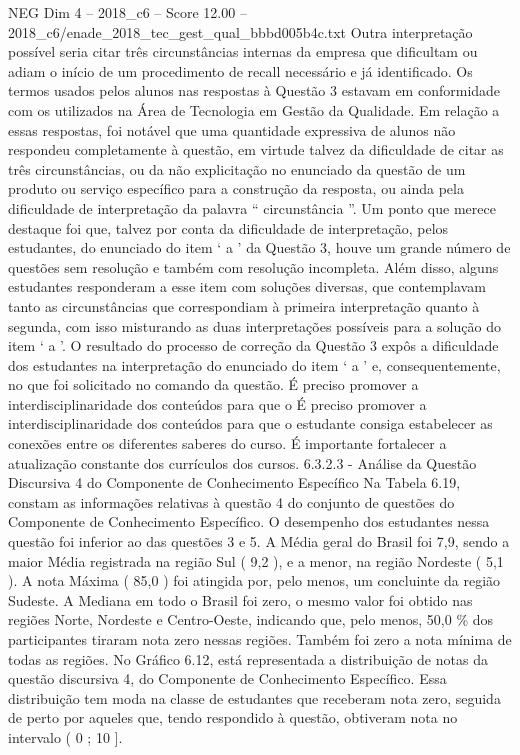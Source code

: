 \begin{textsample}{NEG Dim 4 – 2018\_c6 – Score 12.00 – 2018\_c6/enade\_2018\_tec\_gest\_qual\_bbbd005b4c.txt}
Outra interpretação possível seria citar três circunstâncias internas da empresa que dificultam ou adiam o início de um procedimento de recall necessário e já identificado.
Os termos usados pelos alunos nas respostas à Questão 3 estavam em conformidade com os utilizados na Área de Tecnologia em Gestão da Qualidade.
Em relação a essas respostas, foi notável que uma quantidade expressiva de alunos não respondeu completamente à questão, em virtude talvez da dificuldade de citar as três circunstâncias, ou da não explicitação no enunciado da questão de um produto ou serviço específico para a construção da resposta, ou ainda pela dificuldade de interpretação da palavra “ circunstância ”.
Um ponto que merece destaque foi que, talvez por conta da dificuldade de interpretação, pelos estudantes, do enunciado do item ‘ a ’ da Questão 3, houve um grande número de questões sem resolução e também com resolução incompleta.
Além disso, alguns estudantes responderam a esse item com soluções diversas, que contemplavam tanto as circunstâncias que correspondiam à primeira interpretação quanto à segunda, com isso misturando as duas interpretações possíveis para a solução do item ‘ a ’.
O resultado do processo de correção da Questão 3 expôs a dificuldade dos estudantes na interpretação do enunciado do item ‘ a ’ e, consequentemente, no que foi solicitado no comando da questão.
É preciso promover a interdisciplinaridade dos conteúdos para que o É preciso promover a interdisciplinaridade dos conteúdos para que o estudante consiga estabelecer as conexões entre os diferentes saberes do curso.
É importante fortalecer a atualização constante dos currículos dos cursos. 6.3.2.3 - Análise da Questão Discursiva 4 do Componente de Conhecimento Específico Na Tabela 6.19, constam as informações relativas à questão 4 do conjunto de questões do Componente de Conhecimento Específico.
O desempenho dos estudantes nessa questão foi inferior ao das questões 3 e 5.
A Média geral do Brasil foi 7,9, sendo a maior Média registrada na região Sul ( 9,2 ), e a menor, na região Nordeste ( 5,1 ).
A nota Máxima ( 85,0 ) foi atingida por, pelo menos, um concluinte da região Sudeste.
A Mediana em todo o Brasil foi zero, o mesmo valor foi obtido nas regiões Norte, Nordeste e Centro-Oeste, indicando que, pelo menos, 50,0 \% dos participantes tiraram nota zero nessas regiões.
Também foi zero a nota mínima de todas as regiões.
No Gráfico 6.12, está representada a distribuição de notas da questão discursiva 4, do Componente de Conhecimento Específico.
Essa distribuição tem moda na classe de estudantes que receberam nota zero, seguida de perto por aqueles que, tendo respondido à questão, obtiveram nota no intervalo ( 0 ; 10 ].

\end{textsample}
